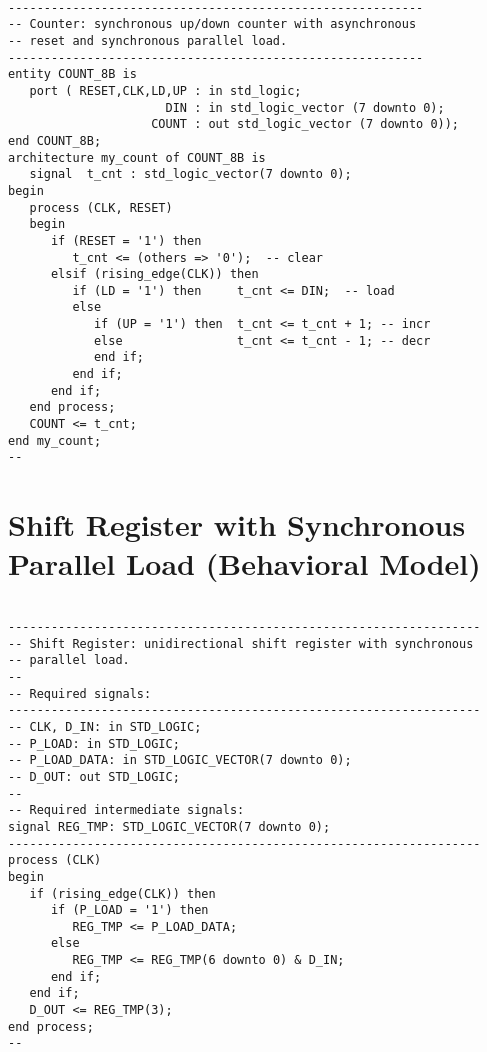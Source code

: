 \noindent
\begin{minipage}{0.99\linewidth}
\begin{lstlisting}

----------------------------------------------------------
-- Counter: synchronous up/down counter with asynchronous 
-- reset and synchronous parallel load. 
----------------------------------------------------------
entity COUNT_8B is
   port ( RESET,CLK,LD,UP : in std_logic; 
                      DIN : in std_logic_vector (7 downto 0); 
                    COUNT : out std_logic_vector (7 downto 0)); 
end COUNT_8B; 
architecture my_count of COUNT_8B is 
   signal  t_cnt : std_logic_vector(7 downto 0); 
begin          
   process (CLK, RESET) 
   begin
      if (RESET = '1') then    
         t_cnt <= (others => '0');  -- clear
      elsif (rising_edge(CLK)) then
         if (LD = '1') then     t_cnt <= DIN;  -- load
         else 
            if (UP = '1') then  t_cnt <= t_cnt + 1; -- incr
            else                t_cnt <= t_cnt - 1; -- decr
            end if;
         end if;
      end if;
   end process;
   COUNT <= t_cnt; 
end my_count;
--
\end{lstlisting}
\end{minipage}

\section{Shift Register with Synchronous Parallel Load (Behavioral Model)}

\noindent
\begin{minipage}{0.99\linewidth}
\begin{lstlisting}

------------------------------------------------------------------
-- Shift Register: unidirectional shift register with synchronous 
-- parallel load. 
-- 
-- Required signals: 
------------------------------------------------------------------
-- CLK, D_IN: in STD_LOGIC;
-- P_LOAD: in STD_LOGIC;
-- P_LOAD_DATA: in STD_LOGIC_VECTOR(7 downto 0);
-- D_OUT: out STD_LOGIC; 
-- 
-- Required intermediate signals: 
signal REG_TMP: STD_LOGIC_VECTOR(7 downto 0);
------------------------------------------------------------------
process (CLK)
begin
   if (rising_edge(CLK)) then
      if (P_LOAD = '1') then
         REG_TMP <= P_LOAD_DATA;
      else
         REG_TMP <= REG_TMP(6 downto 0) & D_IN;
      end if;
   end if;
   D_OUT <= REG_TMP(3);
end process;
--
\end{lstlisting}
\end{minipage}

